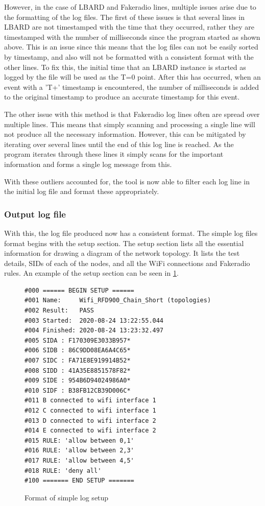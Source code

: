 However, in the case of LBARD and Fakeradio lines, multiple issues arise due to the formatting of the log files.
The first of these issues is that several lines in LBARD are not timestamped with the time that they occurred, rather they are timestamped with the number of milliseconds since the program started as shown above.
This is an issue since this means that the log files can not be easily sorted by timestamp, and also will not be formatted with a consistent format with the other lines.
To fix this, the initial time that an LBARD instance is started as logged by the file will be used as the T=0 point.
After this has occurred, when an event with a 'T+' timestamp is encountered, the number of milliseconds is added to the original timestamp to produce an accurate timestamp for this event.

The other issue with this method is that Fakeradio log lines often are spread over multiple lines.
This means that simply scanning and processing a single line will not produce all the necessary information.
However, this can be mitigated by iterating over several lines until the end of this log line is reached.
As the program iterates through these lines it simply scans for the important information and forms a single log message from this.

With these outliers accounted for, the tool is now able to filter each log line in the initial log file and format these appropriately.


\subsubsection{Output log file}
With this, the log file produced now has a consistent format.
The simple log files format begins with the setup section.
The setup section lists all the essential information for drawing a diagram of the network topology. 
It lists the test details, SIDs of each of the nodes, and all the WiFi connections and Fakeradio rules. 
An example of the setup section can be seen in \figurename{ \ref{fig:chapter5SimpleLogSetup}}.

\begin{figure}
    \begin{centering}
\begin{lstlisting}[frame=single]
#000 ====== BEGIN SETUP ======
#001 Name:     Wifi_RFD900_Chain_Short (topologies)
#002 Result:   PASS
#003 Started:  2020-08-24 13:22:55.044
#004 Finished: 2020-08-24 13:23:32.497
#005 SIDA : F170309E3033B957*
#006 SIDB : 86C9DD08EA6A4C65*
#007 SIDC : FA71E8E919914B52*
#008 SIDD : 41A35E8851578F82*
#009 SIDE : 954B6D94024986A0*
#010 SIDF : B38FB12CB39D006C*
#011 B connected to wifi interface 1
#012 C connected to wifi interface 1
#013 D connected to wifi interface 2
#014 E connected to wifi interface 2
#015 RULE: 'allow between 0,1'
#016 RULE: 'allow between 2,3'
#017 RULE: 'allow between 4,5'
#018 RULE: 'deny all'
#100 ======= END SETUP =======    
\end{lstlisting}
    \caption{Format of simple log setup}
    \label{fig:chapter5SimpleLogSetup}
    \end{centering}
\end{figure}

